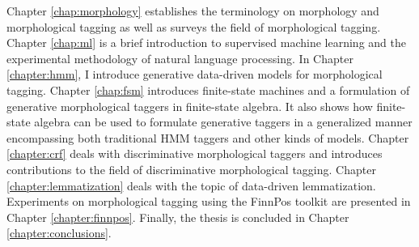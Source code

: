 Chapter \ref{chap:morphology} establishes the terminology on
morphology and morphological tagging as well as surveys the field of
morphological tagging.  Chapter \ref{chap:ml} is a brief introduction
to supervised machine learning and the experimental methodology of
natural language processing.  In Chapter \ref{chapter:hmm}, I
introduce generative data-driven models for morphological tagging.
Chapter \ref{chap:fsm} introduces finite-state machines and a
formulation of generative morphological taggers in finite-state
algebra. It also shows how finite-state algebra can be used to
formulate generative taggers in a generalized manner encompassing
both traditional HMM taggers and other kinds of models.  Chapter
\ref{chapter:crf} deals with discriminative morphological taggers and
introduces contributions to the field of
discriminative morphological tagging.  Chapter
\ref{chapter:lemmatization} deals with the topic of data-driven
lemmatization. Experiments on morphological tagging using the FinnPos
toolkit are presented in Chapter \ref{chapter:finnpos}. Finally, the
thesis is concluded in Chapter \ref{chapter:conclusions}.
